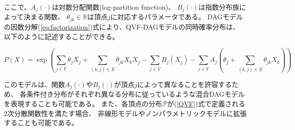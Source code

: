 ここで、$A_j(\cdot)$は対数分配関数(log-partition function)、
$B_j(\cdot)$は指数分布族によって決まる関数、
$\theta_{jk}\in \mathbb R$は頂点$j$に対応するパラメータである。
DAGモデルの因数分解(\ref{eq:factorization})式により、QVF-DAGモデルの同時確率分布は、
以下のように記述することができる。

\begin{equation}
  P(X) = \exp \left( \sum_{j\in V} \theta_{j}X_j + \sum_{(k,j)\in E} \theta_{jk}X_k X_j
  - \sum_{j \in V} B_j(X_j) - \sum_{j \in V} A_j
  \left( \theta_{j} + \sum_{(k,j)\in E} \theta_{jk} X_k \right)\right)
  \label{eq:QVF_factorization}
\end{equation}

このモデルは、関数$A_j(\cdot)$や$B_j(\cdot)$が頂点$j$によって異なることを許容するため、
各条件付き分布がそれぞれ異なる分布に従っているような混合DAGモデルを表現することも可能である。
また、各頂点の分布$\mathcal P$が(\ref{QVF})式で定義される2次分散関数性を満たす場合、
非線形モデルやノンパラメトリックモデルに拡張することも可能である。
